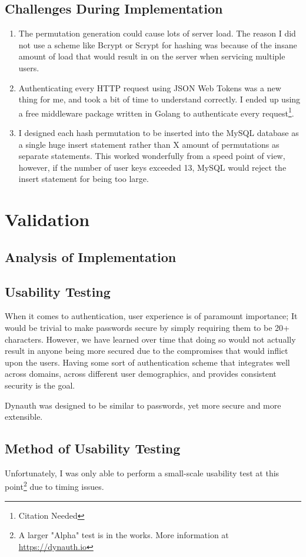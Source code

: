 \documentclass[conference]{IEEEtran}
\begin{document}
\subsection{Challenges During Implementation}
	\begin{enumerate}
		\item The permutation generation could cause lots of server load. The reason I did not use a scheme like Bcrypt or Scrypt for hashing was because of the insane amount of load that would result in on the server when servicing multiple users.
		\item Authenticating every HTTP request using JSON Web Tokens was a new thing for me, and took a bit of time to understand correctly. I ended up using a free middleware package written in Golang to authenticate every request\footnote{Citation Needed}.
		\item I designed each hash permutation to be inserted into the MySQL database as a single huge insert statement rather than X amount of permutations as separate statements. This worked wonderfully from a speed point of view, however, if the number of user keys exceeded 13, MySQL would reject the insert statement for being too large.
	\end{enumerate}
\section{Validation}
	\subsection{Analysis of Implementation}
	\subsection{Usability Testing}
		When it comes to authentication, user experience is of paramount importance; It would be trivial to make passwords secure by simply requiring them to be 20+ characters. However, we have learned over time that doing so would not actually result in anyone being more secured due to the compromises that would inflict upon the users\cite{Citation Needed}. Having some sort of authentication scheme that integrates well across domains, across different user demographics, and provides consistent security is the goal.
		
		Dynauth was designed to be similar to passwords, yet more secure and more extensible.
	\subsection{Method of Usability Testing}
		Unfortunately, I was only able to perform a small-scale usability test at this point\footnote{A larger "Alpha" test is in the works. More information at \url{https://dynauth.io}} due to timing issues. 
		
\end{document}
